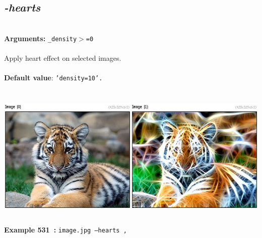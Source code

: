 \documentclass[a4paper,11pt,twoside]{book}
\begin{document}
\subsection{\emph{-hearts} }\vspace*{-0.5em}
~\\\textbf{Arguments: } 
{\small \texttt{\_density$>$=0}}\\~\\
Apply heart effect on selected images.
~\\~\\\textbf{Default value}: {\small \texttt{'density=10'.}}
\begin{center}\includegraphics[keepaspectratio=true,height=7cm,width=\textwidth]{img/gmic_def531.jpg}\\
{\footnotesize \textbf{Example 531~:} \texttt{image.jpg --hearts ,}}
\end{center}
\end{document}
